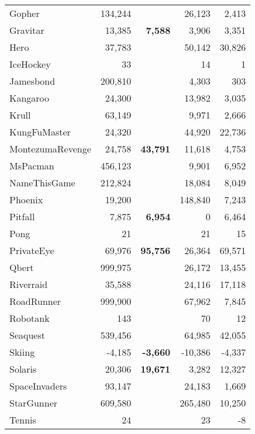 \documentclass{nature}
\begin{document}
\begin{table}[ht!]
\begin{tabular}{l|r|rrr}
Gopher           & 134,244 &             &  26,123 &     2,413 \\
Gravitar         &  13,385 &     \bf{7,588} &   3,906 &     3,351 \\
Hero             &  37,783 &             &  50,142 &    30,826 \\
IceHockey        &      33 &             &      14 &         1 \\
Jamesbond        & 200,810 &             &   4,303 &       303 \\
Kangaroo         &  24,300 &             &  13,982 &     3,035 \\
Krull            &  63,149 &             &   9,971 &     2,666 \\
KungFuMaster     &  24,320 &             &  44,920 &    22,736 \\
MontezumaRevenge &  24,758 &    \bf{43,791} &  11,618 &     4,753 \\
MsPacman         & 456,123 &             &   9,901 &     6,952 \\
NameThisGame     & 212,824 &             &  18,084 &     8,049 \\
Phoenix          &  19,200 &             & 148,840 &     7,243 \\
Pitfall          &   7,875 &     \bf{6,954} &       0 &     6,464 \\
Pong             &      21 &             &      21 &        15 \\
PrivateEye       &  69,976 &    \bf{95,756} &  26,364 &    69,571 \\
Qbert            & 999,975 &             &  26,172 &    13,455 \\
Riverraid        &  35,588 &             &  24,116 &    17,118 \\
RoadRunner       & 999,900 &             &  67,962 &     7,845 \\
Robotank         &     143 &             &      70 &        12 \\
Seaquest         & 539,456 &             &  64,985 &    42,055 \\
Skiing           &  -4,185 &    \bf{-3,660} & -10,386 &    -4,337 \\
Solaris          &  20,306 &    \bf{19,671} &   3,282 &    12,327 \\
SpaceInvaders    &  93,147 &             &  24,183 &     1,669 \\
StarGunner       & 609,580 &             & 265,480 &    10,250 \\
Tennis           &      24 &             &      23 &        -8 \\

\end{tabular}
\end{table}
\end{document}
